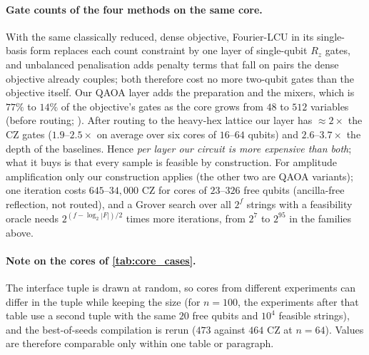 \paragraph{Gate counts of the four methods on the same core.} With the same classically reduced, dense objective, Fourier-LCU in its single-basis form replaces each count constraint by one layer of single-qubit $R_z$ gates, and unbalanced penalisation adds penalty terms that fall on pairs the dense objective already couples; both therefore cost no more two-qubit gates than the objective itself. Our QAOA layer adds the preparation and the mixers, which is $77\%$ to $14\%$ of the objective's gates as the core grows from $48$ to $512$ variables (before routing; ). After routing to the heavy-hex lattice our layer has $\approx2\times$ the CZ gates ($1.9$--$2.5\times$ on average over six cores of $16$--$64$ qubits) and $2.6$--$3.7\times$ the depth of the baselines. Hence \emph{per layer our circuit is more expensive than both}; what it buys is that every sample is feasible by construction. For amplitude amplification only our construction applies (the other two are QAOA variants); one iteration costs $645$--$34{,}000$ CZ for cores of $23$--$326$ free qubits (ancilla-free reflection, not routed), and a Grover search over all $2^f$ strings with a feasibility oracle needs $2^{(f-\log_2|F|)/2}$ times more iterations, from $2^{7}$ to $2^{95}$ in the families above.


\paragraph{Note on the cores of \cref{tab:core_cases}.} The interface tuple is drawn at random, so cores from different experiments can differ in the tuple while keeping the size (for $n=100$, the experiments after that table use a second tuple with the same $20$ free qubits and $10^4$ feasible strings), and the best-of-seeds compilation is rerun ($473$ against $464$ CZ at $n=64$). Values are therefore comparable only within one table or paragraph.
